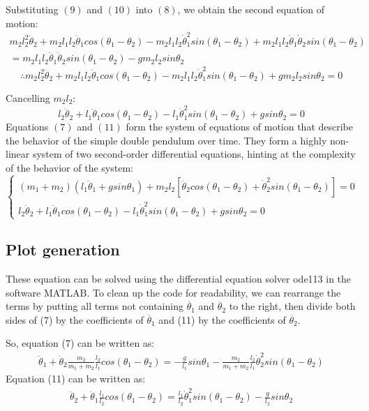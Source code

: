 \documentclass[a4paper,12pt]{article}
\begin{document}
Substituting $(9)$ and $(10)$ into $(8)$, we obtain the second equation of motion:
\begin{multline*}
m_2l_2^2\ddot\theta_2+m_2l_1l_2\ddot\theta_1cos(\theta_1-\theta_2)-m_2l_1l_2\dot\theta_1^2sin(\theta_1-\theta_2)+m_2l_1l_2\dot\theta_1\dot\theta_2sin(\theta_1-\theta_2)
\\
= m_2l_1l_2\dot\theta_1\dot\theta_2sin(\theta_1-\theta_2)-gm_2l_2sin\theta_2
\end{multline*}
\[\therefore m_2l_2^2\ddot\theta_2+m_2l_1l_2\ddot\theta_1cos(\theta_1-\theta_2)-m_2l_1l_2\dot\theta_1^2sin(\theta_1-\theta_2)+gm_2l_2sin\theta_2=0\]

Cancelling $m_2l_2$:
\begin{equation}
    l_2\ddot\theta_2+l_1\ddot\theta_1cos(\theta_1-\theta_2)-l_1\dot\theta_1^2sin(\theta_1-\theta_2)+gsin\theta_2=0
\end{equation}
Equations $(7)$ and $(11)$ form the system of equations of motion that describe the behavior of the simple double pendulum over time. They form a highly non-linear system of two second-order differential equations, hinting at the complexity of the behavior of the system:
\begin{equation*}
    \begin{cases}
        (m_1+m_2)(l_1\ddot\theta_1+gsin\theta_1)+m_2l_2[\ddot\theta_2cos(\theta_1-\theta_2)+\dot\theta_2^2sin(\theta_1-\theta_2)] =0 
    \\
        l_2\ddot\theta_2+l_1\ddot\theta_1cos(\theta_1-\theta_2)-l_1\dot\theta_1^2sin(\theta_1-\theta_2)+gsin\theta_2=0
    \end{cases}
\end{equation*} 
\subsection{Plot generation}
These equation can be solved using the differential equation solver ode113 in the software MATLAB. To clean up the code for readability, we can rearrange the terms by putting all terms not containing $\ddot{\theta_1}$ and $\ddot{\theta_2}$ to the right, then divide both sides of (7) by the coefficients of $\ddot{\theta_1}$ and (11) by the coefficients of $\ddot{\theta_2}$.

So, equation (7) can be written as:
\begin{align*}
    \ddot\theta_1  + \ddot\theta_2\frac{m_2}{m_1+m_2}\frac{l_2}{l_1}cos(\theta_1-\theta_2)=  -\frac{g}{l_1}sin\theta_1 -\frac{m_2}{m_1+m_2}\frac{l_2}{l_1}\dot\theta_2^2sin(\theta_1-\theta_2)
\end{align*}
Equation (11) can be written as:
\begin{align*}
    \ddot\theta_2 + \ddot\theta_1\frac{l_1}{l_2}cos(\theta_1-\theta_2)=\frac{l_1}{l_2}\dot\theta_1^2sin(\theta_1-\theta_2) - \frac{g}{l_2}sin\theta_2
\end{align*}
\end{document}
